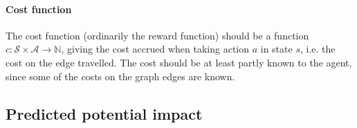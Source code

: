\paragraph{Cost function} The cost function (ordinarily the reward function) should be a function $c \colon \mathcal S \times \mathcal A \to \mathbb N$, giving the cost accrued when taking action $a$ in state $s$, i.e. the cost on the edge travelled. The cost should be at least partly known to the agent, since some of the costs on the graph edges are known.

\subsection{Predicted potential impact}








